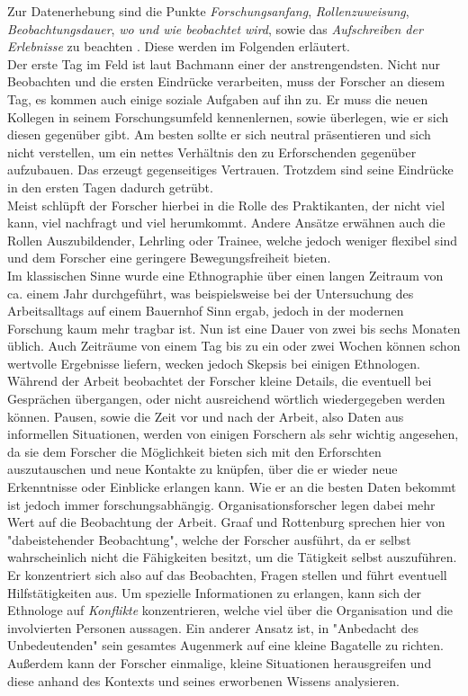 Zur Datenerhebung sind die Punkte \textit{Forschungsanfang}, \textit{Rollenzuweisung}, \textit{Beobachtungsdauer}, \textit{wo und wie beobachtet wird}, sowie das \textit{Aufschreiben der Erlebnisse} zu beachten \cite{kuhl_handbuch_2009}. Diese werden im Folgenden erläutert. \\
Der erste Tag im Feld ist laut Bachmann einer der anstrengendsten. Nicht nur Beobachten und die ersten Eindrücke verarbeiten, muss der Forscher an diesem Tag, es kommen auch einige soziale Aufgaben auf ihn zu. Er muss die neuen Kollegen in seinem Forschungsumfeld kennenlernen, sowie überlegen, wie er sich diesen gegenüber gibt. Am besten sollte er sich neutral präsentieren und sich nicht verstellen, um ein nettes Verhältnis den zu Erforschenden gegenüber aufzubauen. Das erzeugt gegenseitiges Vertrauen. Trotzdem sind seine Eindrücke in den ersten Tagen dadurch getrübt. \\
Meist schlüpft der Forscher hierbei in die Rolle des Praktikanten, der nicht viel kann, viel nachfragt und viel herumkommt. Andere Ansätze erwähnen auch die Rollen Auszubildender, Lehrling oder Trainee, welche jedoch weniger flexibel sind und dem Forscher eine geringere Bewegungsfreiheit bieten. \\
Im klassischen Sinne wurde eine Ethnographie über einen langen Zeitraum von ca. einem Jahr durchgeführt, was beispielsweise bei der Untersuchung des Arbeitsalltags auf einem Bauernhof Sinn ergab, jedoch in der modernen Forschung kaum mehr tragbar ist. Nun ist eine Dauer von zwei bis sechs Monaten üblich. Auch Zeiträume von einem Tag bis zu ein oder zwei Wochen können schon wertvolle Ergebnisse liefern, wecken jedoch Skepsis bei einigen Ethnologen. \\
Während der Arbeit beobachtet der Forscher kleine Details, die eventuell bei Gesprächen übergangen, oder nicht ausreichend wörtlich wiedergegeben werden können. Pausen, sowie die Zeit vor und nach der Arbeit, also Daten aus informellen Situationen, werden von einigen Forschern als sehr wichtig angesehen, da sie dem Forscher die Möglichkeit bieten sich mit den Erforschten auszutauschen und neue Kontakte zu knüpfen, über die er wieder neue Erkenntnisse oder Einblicke erlangen kann. Wie er an die besten Daten bekommt ist jedoch immer forschungsabhängig. Organisationsforscher legen dabei mehr Wert auf die Beobachtung der Arbeit. Graaf und Rottenburg \cite{rottenburg_feldforschung_nodate} sprechen hier von "dabeistehender Beobachtung", welche der Forscher ausführt, da er selbst wahrscheinlich nicht die Fähigkeiten besitzt, um die Tätigkeit selbst auszuführen. Er konzentriert sich also auf das Beobachten, Fragen stellen und führt eventuell Hilfstätigkeiten aus. Um spezielle Informationen zu erlangen, kann sich der Ethnologe auf \textit{Konflikte} konzentrieren, welche viel über die Organisation und die involvierten Personen aussagen. Ein anderer Ansatz ist, in "Anbedacht des Unbedeutenden" sein gesamtes Augenmerk auf eine kleine Bagatelle zu richten. Außerdem kann der Forscher einmalige, kleine Situationen herausgreifen und diese anhand des Kontexts und seines erworbenen Wissens analysieren. \\
